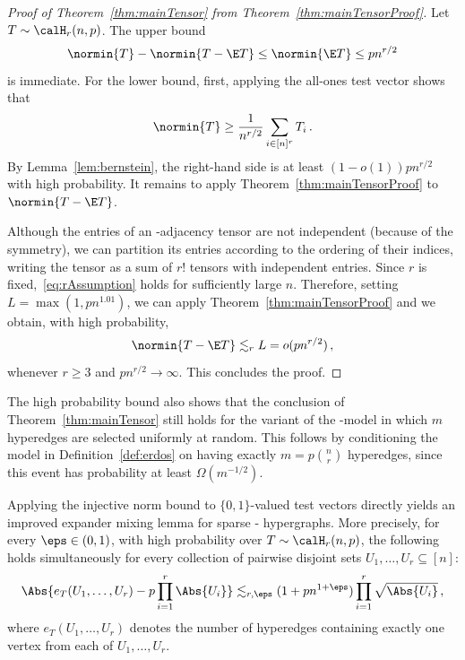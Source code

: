 \documentclass[11pt,a4paper]{article}
\begin{document}
\begin{proof}[Proof of Theorem~\ref{thm:mainTensor} from Theorem~\ref{thm:mainTensorProof}]
    Let $T\sim \calH_r(n,p)$. The upper bound \[\normin{T} - \normin{T - \E T}\le \normin{\E T}\le pn^{r/2}\]is immediate. For the lower bound, first, applying the
    all-ones
    test vector shows that
    \[
        \normin{T}\ge \frac 1 {n^{r/2}} \sum_{i\in [n]^r} T_i\,.
    \]
    By Lemma~\ref{lem:bernstein}, the right-hand side is at least $(1-o(1))pn^{r/2}$
    with high probability. It remains
    to apply Theorem~\ref{thm:mainTensorProof} to $\normin{T - \E T}$. 
    
    Although the entries of an \Erdos-\Renyi adjacency tensor are not independent (because of the symmetry), we can partition its entries according to the ordering of their indices, writing the tensor as a sum of $r!$ tensors with independent entries. Since $r$ is fixed,~\eqref{eq:rAssumption} holds
    for sufficiently large $n$.
    Therefore, setting $L=\max(1, pn^{1.01})$, we can apply Theorem~\ref{thm:mainTensorProof} and we obtain, with high probability,
    \[
        \normin{T - \E T}\lesssim_r L = o(pn^{r/2})\,,
    \]
    whenever $r\ge 3$ and $pn^{r/2}\to\infty$. This concludes the proof.
\end{proof}

\begin{remark}    
    The high probability bound also shows
    that the conclusion of Theorem~\ref{thm:mainTensor} still holds for the variant of the
    \Erdos-\Renyi model in which $m$ hyperedges are selected
    uniformly at random. This follows by conditioning the model in Definition~\ref{def:erdos}
    on having exactly $m=p\binom {n} r$ hyperedges,
    since this event has probability
    at least $\Omega(m^{-1/2})$.
\end{remark}

\begin{example}\label{ex:mixingLemma}
    Applying the injective norm bound
    to $\{0,1\}$-valued test vectors
    directly yields an improved expander
    mixing lemma for sparse \Erdos-\Renyi
    hypergraphs. More precisely, for every
    $\eps\in (0,1)$, with high probability over $T\sim \calH_r(n,p)$, the following holds
    simultaneously
    for every collection of pairwise disjoint sets $U_1, \ldots, U_r\subseteq [n]$:
    \[
        \Abs{e_T(U_1, \ldots, U_r) - p \prod_{i=1}^r \Abs{U_i}}\lesssim_{r,\eps} (1+pn^{1+\eps})\prod_{i=1}^r \sqrt{\Abs{U_i}}\,,
    \]
    where $e_T(U_1, \ldots, U_r)$ denotes the
    number of hyperedges containing
    exactly one vertex from each of $U_1, \ldots, U_r$.
\end{example}
\end{document}
